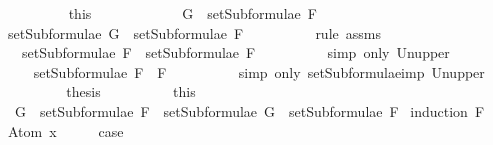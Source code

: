 \begin{isabellebody}
\ \ \ \ \ \ \ \ \isamarkupfalse%
\ this\isanewline
\ \ \ \ \isamarkupfalse%
\isanewline
\ \ \ \ \ \ \isamarkupfalse%
\ {\isachardoublequoteopen}G\ {\isasymin}\ setSubformulae\ F{}{\isachardoublequoteclose}\isanewline
\ \ \ \ \ \ \isamarkupfalse%
\ \isamarkupfalse%
\ {\isachardoublequoteopen}setSubformulae\ G\ {\isasymsubseteq}\ setSubformulae\ F{}{\isachardoublequoteclose}\isanewline
\ \ \ \ \ \ \ \ \isamarkupfalse%
\ {\isacharparenleft}rule\ assms{\isacharparenleft}{}{\isacharparenright}{\isacharparenright}\isanewline
\ \ \ \ \ \ \isamarkupfalse%
\ \isamarkupfalse%
\ {\isachardoublequoteopen}{\isasymdots}\ {\isasymsubseteq}\ setSubformulae\ F{}\ {\isasymunion}\ setSubformulae\ F{}{\isachardoublequoteclose}\isanewline
\ \ \ \ \ \ \ \ \isamarkupfalse%
\ {\isacharparenleft}simp\ only{\isacharcolon}\ Un{\isacharunderscore}upper{}{\isacharparenright}\isanewline
\ \ \ \ \ \ \isamarkupfalse%
\ \isamarkupfalse%
\ {\isachardoublequoteopen}{\isasymdots}\ {\isasymsubseteq}\ setSubformulae\ {\isacharparenleft}F{}\ \isactrlbold {\isasymrightarrow}\ F{}{\isacharparenright}{\isachardoublequoteclose}\isanewline
\ \ \ \ \ \ \ \ \isamarkupfalse%
\ {\isacharparenleft}simp\ only{\isacharcolon}\ setSubformulae{\isacharunderscore}imp\ Un{\isacharunderscore}upper{}{\isacharparenright}\isanewline
\ \ \ \ \ \ \isamarkupfalse%
\ \isamarkupfalse%
\ {\isacharquery}thesis\isanewline
\ \ \ \ \ \ \ \ \isamarkupfalse%
\ this\isanewline
\ \ \ \ \isamarkupfalse%
\isanewline
\ \ \isamarkupfalse%
\isanewline
{}\isamarkupfalse%
%
\endisatagproof
{\isafoldproof}%
%
\isadelimproof
\isanewline
%
\endisadelimproof
\isanewline
{}\isamarkupfalse%
\isanewline
\ \ {\isachardoublequoteopen}G\ {\isasymin}\ setSubformulae\ F\ {\isasymLongrightarrow}\ setSubformulae\ G\ {\isasymsubseteq}\ setSubformulae\ F{\isachardoublequoteclose}\isanewline
%
\isadelimproof
%
\endisadelimproof
%
\isatagproof
{}\isamarkupfalse%
\ {\isacharparenleft}induction\ F{\isacharparenright}\isanewline
{}\isamarkupfalse%
\ {\isacharparenleft}Atom\ x{\isacharparenright}\isanewline
\ \ \isamarkupfalse%
\ \isamarkupfalse%
\ {\isacharquery}case\ \isamarkupfalse%

\end{isabellebody}
